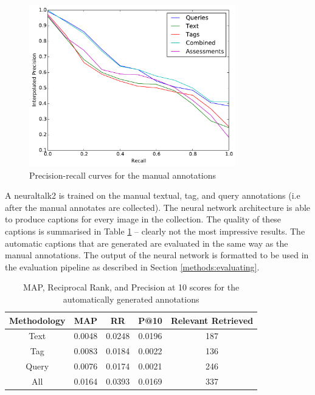 \begin{figure}[ht]
    \centering
    \includegraphics[width=0.8\textwidth]{graphs/manual-result}
    \caption{Precision-recall curves for the manual annotations}
    \label{fig:manual-result}
\end{figure}

\FloatBarrier

A neuraltalk2 is trained on the manual textual, tag, and query annotations (i.e after the manual annotates are collected). The neural network architecture is able to produce captions for every image in the collection. The quality of these captions is summarised in Table \ref{table:learnt-results} -- clearly not the most impressive results. The automatic captions that are generated are evaluated in the same way as the manual annotations. The output of the neural network is formatted to be used in the evaluation pipeline as described in Section \ref{methods:evaluating}. 

\begin{table}[ht]
    \centering
    \begin{tabular}{|c|c|c|c|c|}
        \hline
         Methodology & MAP & RR & P@10 & Relevant Retrieved\\ \hline
         Text & 0.0048 & 0.0248 & 0.0196 & 187 \\ \hline
         Tag & 0.0083 & 0.0184 & 0.0022 & 136 \\ \hline
         Query & 0.0076 & 0.0174 & 0.0021 & 246 \\ \hline
         All & 0.0164 & 0.0393 & 0.0169 & 337 \\ \hline
    \end{tabular}
    \caption{MAP, Reciprocal Rank, and Precision at 10 scores for the automatically generated annotations}
    \label{table:learnt-results}
\end{table}

